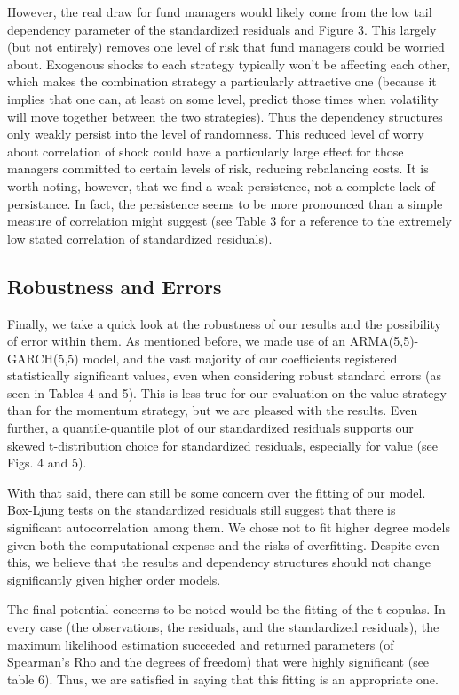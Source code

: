 \documentclass[11pt,letterpaper]{memoir}
\begin{document}
However, the real draw for fund managers would likely come from the low tail dependency parameter of the standardized residuals and Figure 3. This largely (but not entirely) removes one level of risk that fund managers could be worried about. Exogenous shocks to each strategy typically won't be affecting each other, which makes the combination strategy a particularly attractive one (because it implies that one can, at least on some level, predict those times when volatility will move together between the two strategies). Thus the dependency structures only weakly persist into the level of randomness. This reduced level of worry about correlation of shock could have a particularly large effect for those managers committed to certain levels of risk, reducing rebalancing costs. It is worth noting, however, that we find a weak persistence, not a complete lack of persistance. In fact, the persistence seems to be more pronounced than a simple measure of correlation might suggest (see Table 3 for a reference to the extremely low stated correlation of standardized residuals).

\subsection*{Robustness and Errors}
Finally, we take a quick look at the robustness of our results and the possibility of error within them. As mentioned before, we made use of an ARMA(5,5)-GARCH(5,5) model, and the vast majority of our coefficients registered statistically significant values, even when considering robust standard errors (as seen in Tables 4 and 5). This is less true for our evaluation on the value strategy than for the momentum strategy, but we are pleased with the results. Even further, a quantile-quantile plot of our standardized residuals supports our skewed t-distribution choice for standardized residuals, especially for value (see Figs. 4 and 5). 

With that said, there can still be some concern over the fitting of our model. Box-Ljung tests on the standardized residuals still suggest that there is significant autocorrelation among them. We chose not to fit higher degree models given both the computational expense and the risks of overfitting. Despite even this, we believe that the results and dependency structures should not change significantly given higher order models. 

The final potential concerns to be noted would be the fitting of the t-copulas. In every case (the observations, the residuals, and the standardized residuals), the maximum likelihood estimation succeeded and returned parameters (of Spearman's Rho and the degrees of freedom) that were highly significant (see table 6). Thus, we are satisfied in saying that this fitting is an appropriate one.
\end{document}
